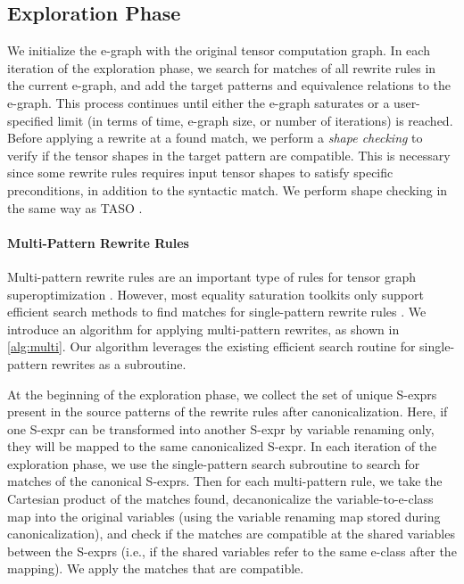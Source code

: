 \subsection{Exploration Phase}
\label{sec:saturation}

We initialize the e-graph with the original tensor computation graph.
In each iteration of the exploration phase, we search for matches of all rewrite rules in the current e-graph, and add the target patterns and equivalence relations to the e-graph.
This process continues until either the e-graph saturates or a user-specified limit (in terms of time, e-graph size, or number of iterations) is reached.
Before applying a rewrite at a found match, we perform a \textit{shape checking} to verify if the tensor shapes in the target pattern are compatible.
This is necessary since some rewrite rules requires input tensor shapes to satisfy specific preconditions, in addition to the syntactic match.
We perform shape checking in the same way as TASO \cite{taso}.


\paragraph{Multi-Pattern Rewrite Rules}

Multi-pattern rewrite rules are an important type of rules for tensor graph superoptimization \cite{taso}.
However, most equality saturation toolkits only support efficient search methods to find matches for single-pattern rewrite rules \cite{egg, ematching}.
We introduce an algorithm for applying multi-pattern rewrites, as shown in \autoref{alg:multi}. Our algorithm leverages the existing efficient search routine for single-pattern rewrites as a subroutine.

At the beginning of the exploration phase, we collect the set of unique S-exprs present in the source patterns of the rewrite rules after canonicalization.
Here, if one S-expr can be transformed into another S-expr by variable renaming only, they will be mapped to the same canonicalized S-expr.
In each iteration of the exploration phase, we use the single-pattern search subroutine to search for matches of the canonical S-exprs.
Then for each multi-pattern rule, we take the Cartesian product of the matches found, decanonicalize the variable-to-e-class map into the original variables (using the variable renaming map stored during canonicalization), and check if the matches are compatible at the shared variables between the S-exprs (i.e., if the shared variables refer to the same e-class after the mapping).
We apply the matches that are compatible.

